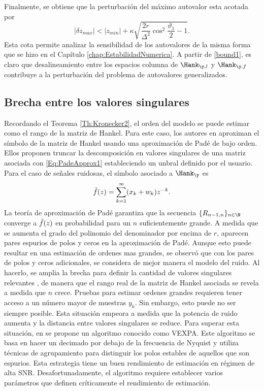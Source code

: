 Finalmente, se obtiene que la perturbación del máximo autovalor esta acotada por
\begin{equation}
	|\delta z_{max}|<|z_{min}| + \kappa\sqrt{\frac{2r}{\Delta^2}\cos^2\frac{\vartheta_1}{2}-1}.
	\label{bound1}
\end{equation}
Esta cota permite analizar la sensibilidad de los autovalores de la misma forma que se hizo en el Capítulo \ref{chap:EstabilidadNumerica}. A partir de \eqref{bound1}, es claro que desalineamiento entre los espacios columna de $\Hank_{\y,l}$ y $\Hank_{\y,f}$ contribuye a la perturbación del problema de autovalores generalizados.

\subsection{Brecha entre los valores singulares}

Recordando el Teorema \ref{Th:Kronecker2}, el orden del modelo se puede estimar como el rango de la matriz de Hankel. Para este caso, los autores en \cite{Gonnet2013} aproximan el símbolo de la matriz de Hankel usando una aproximación de Padé de bajo orden. Ellos proponen truncar la descomposición en valores singulares de una matriz asociada con \eqref{Eq:PadeApprox1} estableciendo un unbral definido por el usuario. Para el caso de señales ruidosas, el símbolo asociado a $\Hank_{\y}$ es
\[\Tilde{f}(z) = \sum_{k=1}^{\infty}(x_k+w_k)z^{-k}.\]
La teoría de aproximación de Padé garantiza que la secuencia $\{R_{n-1,n}\}_{n\in\N}$ converge a $\Tilde{f}(z)$ en probabilidad para un $n$ suficientemente grande. A medida que se aumenta el grado del polinomio del denominador por encima de $r$, aparecen pares espurios de polos y ceros en la aproximación de Padé. Aunque esto puede resultar en una estimación de ordenes mas grandes, se observó que con los pares de polos y ceros adicionales, se considera de mejor manera el modelo del ruido. Al hacerlo, se amplia la brecha para definir la cantidad de valores singulares relevantes \cite{Cuyt2018}, de manera que el rango real de la matriz de Hankel asociada se revela a medida que $n$ crece. Pruebas para estimar ordenes grandes requieren tener acceso a un número mayor de muestras $y_k$. Sin embargo, esto puede no ser siempre posible. Esta situación empeora a medida que la potencia de ruido aumenta y la distancia entre valores singulares se reduce. Para superar esta situación, en \cite{BRIANI2020}  se propone un algoritmo conocido como VEXPA. Este algoritmo se basa en hacer un decimado por debajo de la frecuencia de Nyquist y utiliza técnicas de agrupamiento para distinguir los polos estables de aquellos que son espurios. Esta estrategia tiene un buen rendimiento de estimación en régimen de alta SNR. Desafortunadamente, el algoritmo requiere establecer varios parámetros que definen críticamente el rendimiento de estimación.
